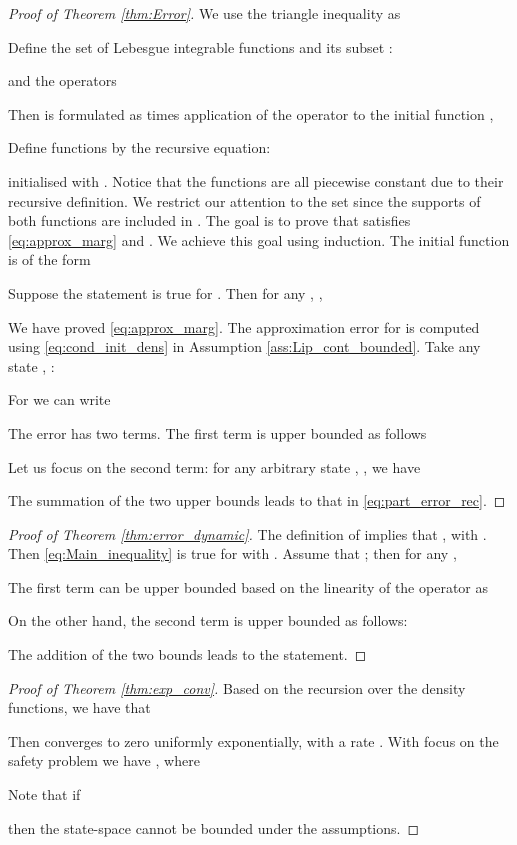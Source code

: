 \documentclass{LMCS}
\begin{document}
\begin{proof}[Proof of Theorem \ref{thm:Error}]
We use the triangle inequality as 

Define the set of Lebesgue integrable functions  and its subset :

and the operators

Then  is formulated as times application of the operator  to the initial function ,

Define functions  by the recursive equation:

initialised with .
Notice that the functions  are all piecewise constant due to their recursive definition. We restrict our attention to the set  since the supports of both functions  are included in . 
The goal is to
prove that  satisfies \eqref{eq:approx_marg} and .
We achieve this goal using induction. The initial function  is of the form

Suppose the statement is true for . Then for any , ,

We have proved \eqref{eq:approx_marg}.
The approximation error for  is computed using \eqref{eq:cond_init_dens} in Assumption \ref{ass:Lip_cont_bounded}. Take any state , :

For  we can write

The error has two terms. The first term is upper bounded as follows

Let us focus on the second term: 
for any arbitrary state , , we have 

The summation of the two upper bounds leads to that in \eqref{eq:part_error_rec}.
\end{proof}

\begin{proof}[Proof of Theorem \ref{thm:error_dynamic}]
The definition of  implies that , 
with . 
Then \eqref{eq:Main_inequality} is true for  with . 
Assume that ; 
then for any , 

The first term can be upper bounded based on the linearity of the operator  as 

On the other hand, the second term is upper bounded as follows: 

The addition of the two bounds leads to the statement. 
\end{proof}

\begin{proof}[Proof of Theorem \ref{thm:exp_conv}]
Based on the recursion over the density functions, we have that 

Then  converges to zero uniformly exponentially, with a rate . 
With focus on the safety problem we have , where

Note that if 

then the state-space cannot be bounded under the assumptions. 
\end{proof}
\end{document}
